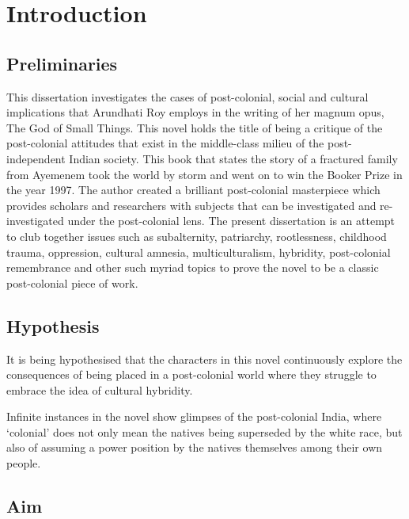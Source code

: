 \chapter{Introduction}

\section{Preliminaries}

This  dissertation  investigates  the  cases  of  post-colonial,  social  and  cultural  implications  that  Arundhati  Roy  employs  in  the  writing  of  her  magnum  opus,  The  God  of  Small  Things.  This  novel  holds  the  title  of  being  a  critique  of  the  post-colonial  attitudes  that  exist  in  the  middle-class  milieu  of  the  post-independent  Indian  society.  This  book  that  states  the  story  of  a  fractured  family  from  Ayemenem  took  the  world  by  storm  and  went  on  to  win  the  Booker  Prize  in  the  year  1997.  The  author  created  a  brilliant  post-colonial  masterpiece  which  provides  scholars  and  researchers  with  subjects  that  can  be  investigated  and  re-investigated  under  the  post-colonial  lens.  The  present  dissertation  is  an  attempt  to  club  together  issues  such  as  subalternity,  patriarchy,  rootlessness,  childhood  trauma,  oppression,  cultural  amnesia,  multiculturalism,  hybridity,  post-colonial  remembrance  and  other  such  myriad  topics  to  prove  the  novel  to  be  a  classic  post-colonial  piece  of  work.

\section{Hypothesis}

It  is  being  hypothesised  that  the  characters  in  this  novel  continuously  explore  the  consequences  of  being  placed  in  a  post-colonial  world  where  they  struggle  to  embrace  the  idea  of  cultural  hybridity.

Infinite  instances  in  the  novel  show  glimpses  of  the  post-colonial  India,  where  ‘colonial’  does  not  only  mean  the  natives  being  superseded  by  the  white  race,  but  also  of  assuming a  power  position  by  the  natives  themselves  among  their  own  people.  

\section{Aim}

